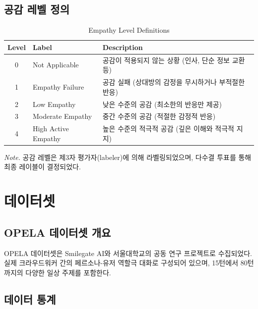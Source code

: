 \documentclass[11pt, a4paper]{article}
\begin{document}
\subsection{공감 레벨 정의}

\begin{table}[H]
\centering
\caption{Empathy Level Definitions}
\label{tab:empathy_levels}
\begin{tabular}{clp{8cm}}
\toprule
\textbf{Level} & \textbf{Label} & \textbf{Description} \\
\midrule
0 & Not Applicable & 공감이 적용되지 않는 상황 (인사, 단순 정보 교환 등) \\
1 & Empathy Failure & 공감 실패 (상대방의 감정을 무시하거나 부적절한 반응) \\
2 & Low Empathy & 낮은 수준의 공감 (최소한의 반응만 제공) \\
3 & Moderate Empathy & 중간 수준의 공감 (적절한 감정적 반응) \\
4 & High Active Empathy & 높은 수준의 적극적 공감 (깊은 이해와 적극적 지지) \\
\bottomrule
\end{tabular}

\vspace{0.5em}
\footnotesize\textit{Note.} 공감 레벨은 제3자 평가자(labeler)에 의해 라벨링되었으며, 다수결 투표를 통해 최종 레이블이 결정되었다.
\end{table}

\section{데이터셋}

\subsection{OPELA 데이터셋 개요}
OPELA 데이터셋은 Smilegate AI와 서울대학교의 공동 연구 프로젝트로 수집되었다.
실제 크라우드워커 간의 페르소나-유저 역할극 대화로 구성되어 있으며, 
15턴에서 80턴까지의 다양한 일상 주제를 포함한다.

\subsection{데이터 통계}
\end{document}
